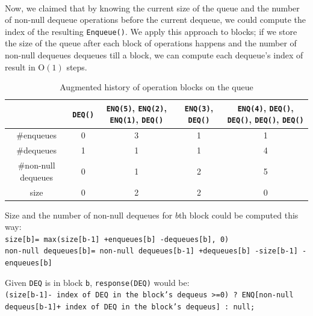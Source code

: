\documentclass[10pt]{article}
\theoremstyle{definition}
\newtheorem{definition}[theorem]{Definition}
\begin{document}
\pagebreak
\paragraph{}
Now, we claimed that by knowing the current size of the queue and the number of non-null dequeue operations before the current dequeue, we could compute the index of the resulting \texttt{Enqueue()}. We apply this approach to blocks; if we store the size of the queue after each block of operations happens and the number of non-null dequeues dequeues till a block, we can compute each dequeue's index of result in \textsc{O}$(1)$ steps.

\begin{table}[hbt]
\centering
  \begin{tabular}{c|c|c|c|c}
    \hline &\texttt{DEQ()} & \texttt{ENQ(5)}, \texttt{ENQ(2)}, \texttt{ENQ(1)}, \texttt{DEQ()}& \texttt{ENQ(3)}, \texttt{DEQ()}&  \texttt{ENQ(4)}, \texttt{DEQ()}, \texttt{DEQ()}, \texttt{DEQ()}, \texttt{DEQ()}\\ \hline
    \#enqueues & 0 & 3 & 1 & 1 \\ \hline
        \#dequeues & 1 & 1 & 1 & 4 \\ \hline
            \#non-null dequeues & 0 & 1 & 2 & 5 \\ \hline
                size & 0 & 2 & 2 & 0 \\ \hline
  \end{tabular}
  \caption{Augmented history of operation blocks on the queue}
\end{table}

%  
%  

Size and the number of non-null dequeues for $b$th block could be computed this way:\\
\texttt{size[b]= max(size[b-1] +enqueues[b] -dequeues[b], 0)}\\
\texttt{non-null dequeues[b]= non-null dequeues[b-1] +dequeues[b] -size[b-1] -enqueues[b]}

Given \texttt{DEQ} is in block \texttt{b}, \texttt{response(DEQ)} would be:\\
\texttt{(size[b-1]- index of DEQ in the block's dequeus >=0) ? ENQ[non-null dequeus[b-1]+ index of DEQ in the block's dequeus] : null;}
\end{document}
